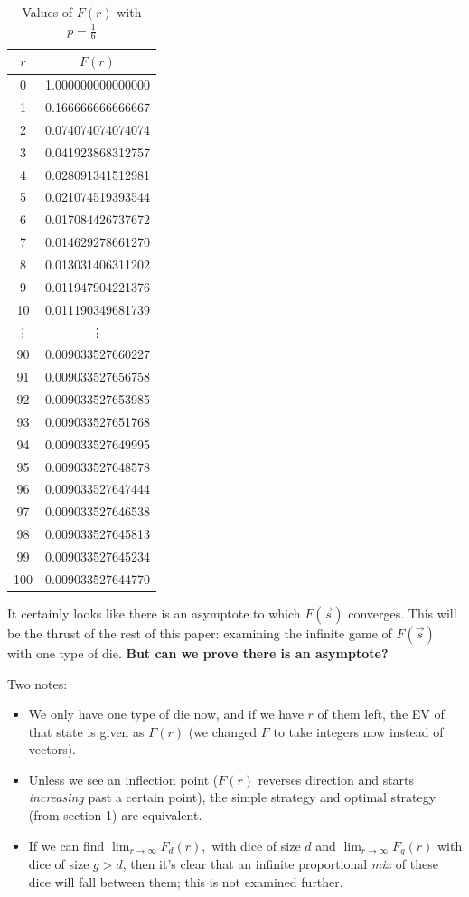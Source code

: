 \documentclass[11pt, oneside]{article} 	%
\begin{document}
\begin{table}[h]
\centering
\begin{tabular}{|c|c|}
\hline
$r$ & $F(r)$ \\
\hline
0 & 1.000000000000000 \\
1 & 0.166666666666667 \\
2 & 0.074074074074074 \\
3 & 0.041923868312757 \\
4 & 0.028091341512981 \\
5 & 0.021074519393544 \\
6 & 0.017084426737672 \\
7 & 0.014629278661270 \\
8 & 0.013031406311202 \\
9 & 0.011947904221376 \\
10 & 0.011190349681739 \\
\hline
\vdots & \vdots \\
\hline
90 & 0.009033527660227 \\
91 & 0.009033527656758 \\
92 & 0.009033527653985 \\
93 & 0.009033527651768 \\
94 & 0.009033527649995 \\
95 & 0.009033527648578 \\
96 & 0.009033527647444 \\
97 & 0.009033527646538 \\
98 & 0.009033527645813 \\
99 & 0.009033527645234 \\
100 & 0.009033527644770 \\
\hline
\end{tabular}
\caption{Values of $F(r)$ with $p=\frac1{6}$}
\label{tab:p_values}
\end{table}


It certainly looks like there is an asymptote to which $F(\vec{s})$ converges.  This will be the thrust of the rest of this paper: examining the infinite game of $F(\vec{s})$ with one type of die.  \textbf{But can we prove there is an asymptote?}

Two notes:

\begin{itemize}
\item We only have one type of die now, and if we have $r$ of them left, the EV of that state is given as $F(r)$ (we changed $F$ to take integers now instead of vectors).
\item  Unless we see an inflection point ($F(r)$ reverses direction and starts \textit{increasing} past a certain point), the simple strategy and optimal strategy (from section 1) are equivalent.  
\item If we can find $\lim_{r \rightarrow \infty} F_d(r), $ with dice of size $d$ and $\lim_{r \rightarrow \infty} F_g(r)$ with dice of size $g > d$, then it's clear that an infinite proportional \textit{mix} of these dice will fall between them; this is not examined further.
\end{itemize}
\end{document}
